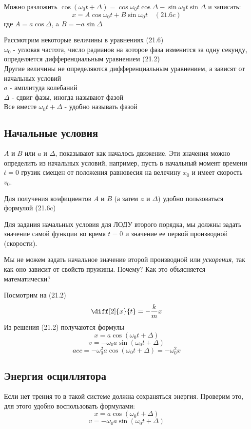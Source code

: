 \documentclass[12pt]{article}
\begin{document}
Можно разложить $\cos(\omega_0t+\Delta)=\cos\omega_0t\cos\Delta-\sin\omega_0t\sin\Delta$ и записать:
\[
    x=A\cos\omega_0t+B\sin\omega_0t \quad (21.6c)
\]
где $A=a\cos\Delta$, a $B=-a\sin\Delta$

\medskip

Рассмотрим некоторые величины в уравнениях (21.6)
\\
$\omega_0$ - угловая частота, число радианов на которое фаза изменится за одну секунду, определяется дифференциальным уравнением (21.2)
\\
Другие величины не определяются дифференциальным уравнением, а зависят от начальных условий
\\
$a$ - амплитуда колебаний
\\
$\Delta$ - сдвиг фазы, иногда называют фазой
\\
Все вместе $\omega_0t+\Delta$ - удобно называть фазой

\subsection{Начальные условия}

$A$ и $B$ или $a$ и $\Delta$, показывают как началось движение. Эти значения можно определить из начальных условий, например, пусть в начальный момент времени $t=0$ грузик смещен от положения равновесия на велечину $x_0$ и имеет скорость  $v_0$.

Для получения коэфициентов $A$ и $B$ (а затем $a$ и $\Delta$) удобно пользоваться формулой (21.6c)

Для задания начальных условия для ЛОДУ второго порядка, мы должны задать значение самой функции во время $t=0$ и значение ее первой производной (скорости).

Мы не можем задать начальное значение второй производной или \textit{ускорения}, так как оно зависит от свойств пружины. Почему? Как это объясняется математически?

Посмотрим на (21.2)
\[
\diff[2]{x}{t}=-\frac{k}{m}x
\]
Из решения (21.2) получаются формулы
\[
    x=a\cos(\omega_0t+\Delta)
\]
\[
    v=-\omega_0a\sin(\omega_0t+\Delta)
\]
\[
    acc=-\omega_0^2a\cos(\omega_0t+\Delta)=-\omega_0^2x
\]

\subsection{Энергия осциллятора}

Если нет трения то в такой системе должна сохраняться энергия. Проверим это, для этого удобно воспользовать формулами:
\[
    x=a\cos(\omega_0t+\Delta)
\]
\[
    v=-\omega_0a\sin(\omega_0t+\Delta)
\]
\end{document}
